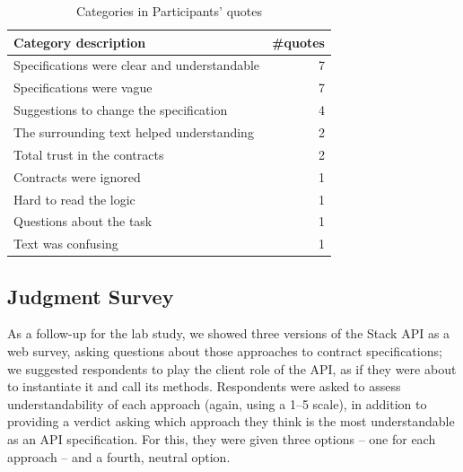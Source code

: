 \begin{table}
\centering
\caption{Categories in Participants' quotes}
\label{tab:categories}
\begin{tabular}{|l|r|} 
\hline
\textbf{Category description}                & \multicolumn{1}{l|}{\textbf{\#quotes}}  \\ 
\hline\hline
Specifications were clear and understandable & 7                                       \\ 
\hline
Specifications were vague                    & 7                                       \\ 
\hline
Suggestions to change the specification      & 4                                       \\ 
\hline
The surrounding text helped understanding    & 2                                       \\ 
\hline
Total trust in the contracts                 & 2                                       \\ 
\hline
Contracts were ignored                       & 1                                       \\ 
\hline
Hard to read the logic                       & 1                                       \\ 
\hline
Questions about the task                     & 1                                       \\ 
\hline
Text was confusing                           & 1                                       \\
\hline
\end{tabular}
\end{table}


\subsection{Judgment Survey}
\label{sec:surveyResults}

As a follow-up for the lab study, we showed three versions of the Stack API as a web survey, asking questions about those approaches to contract specifications; we suggested respondents to play the client role of the API, as if they were about to instantiate it and call its methods.
Respondents were asked to assess understandability of each approach (again, using a 1--5 scale), in addition to providing a verdict asking which approach they think is the most understandable as an API specification. For this, they were given three options -- one for each approach -- and a fourth, neutral option.

